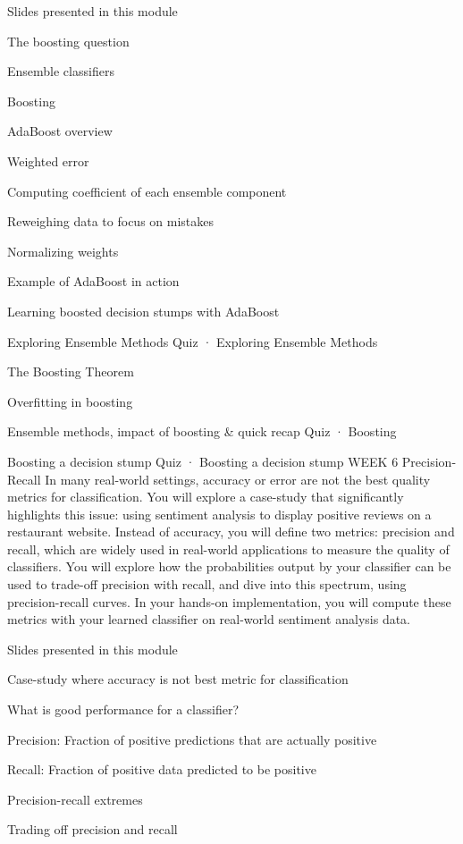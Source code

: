 \item Slides presented in this module
\item The boosting question
\item Ensemble classifiers
\item Boosting
\item AdaBoost overview
\item Weighted error
\item Computing coefficient of each ensemble component
\item Reweighing data to focus on mistakes
\item Normalizing weights
\item Example of AdaBoost in action
\item Learning boosted decision stumps with AdaBoost
\item Exploring Ensemble Methods
Quiz · Exploring Ensemble Methods
\item The Boosting Theorem
\item Overfitting in boosting
\item Ensemble methods, impact of boosting & quick recap
Quiz · Boosting
\item Boosting a decision stump
Quiz · Boosting a decision stump
WEEK 6
Precision-Recall
In many real-world settings, accuracy or error are not the best quality metrics for classification. You will explore a case-study that significantly highlights this issue: using sentiment analysis to display positive reviews on a restaurant website. Instead of accuracy, you will define two metrics: precision and recall, which are widely used in real-world applications to measure the quality of classifiers. You will explore how the probabilities output by your classifier can be used to trade-off precision with recall, and dive into this spectrum, using precision-recall curves. In your hands-on implementation, you will compute these metrics with your learned classifier on real-world sentiment analysis data.
\item Slides presented in this module
\item Case-study where accuracy is not best metric for classification
\item What is good performance for a classifier?
\item Precision: Fraction of positive predictions that are actually positive
\item Recall: Fraction of positive data predicted to be positive
\item Precision-recall extremes
\item Trading off precision and recall
